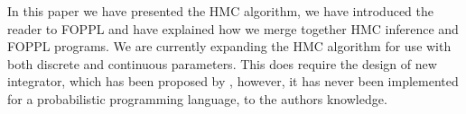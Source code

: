 \documentclass[twoside]{article}
\begin{document}
In this paper we have presented the HMC algorithm, we have introduced the reader to FOPPL and have explained how we merge together HMC inference and FOPPL programs. We are currently expanding the HMC algorithm for use with both discrete and continuous parameters. This does require the design of new integrator, which has been proposed by \citep{nishimura2017discontinuous}, however, it has never been implemented for a probabilistic programming language, to the authors knowledge.  

%
%
%
%
%
%
\end{document}
